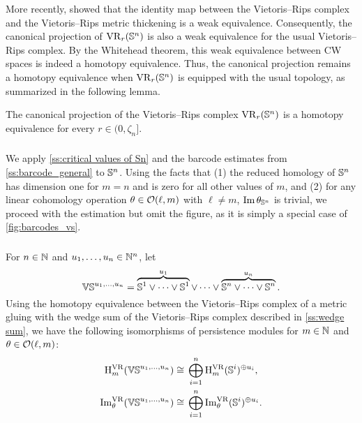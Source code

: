 More recently, \cite{gillespie2024vietoris} showed that the identity map between the Vietoris--Rips complex and the Vietoris--Rips metric thickening is a weak equivalence.
Consequently, the canonical projection of \(\mathrm{VR}_r(\mathbb{S}^n)\) is also a weak equivalence for the usual Vietoris--Rips complex. By the Whitehead theorem, this weak equivalence between CW spaces is indeed a homotopy equivalence.
Thus, the canonical projection remains a homotopy equivalence when \(\mathrm{VR}_r(\mathbb{S}^n)\) is equipped with the usual topology, as summarized in the following lemma.

\lemma
The canonical projection of the Vietoris--Rips complex \(\mathrm{VR}_r(\mathbb{S}^n)\) is a homotopy equivalence for every $r \in (0, \zeta_n]$.

\subsubsection{}\label{ss:barcode_Sn}

We apply \cref{ss:critical values of Sn} and the barcode estimates from \cref{ss:barcode_general} to \(\mathbb{S}^n\).
Using the facts that (1) the reduced homology of \(\mathbb{S}^n\) has dimension one for \(m = n\) and is zero for all other values of \(m\), and (2) for any linear cohomology operation \(\theta \in \mathcal{O}(\ell, m)\) with \(\ell \neq m\), \(\operatorname{Im} \theta_{\mathbb{S}^n}\) is trivial, we proceed with the estimation but omit the figure, as it is simply a special case of \cref{fig:barcodes_vs}.

\subsubsection{}\label{ss:barcodes_VS}

For $n \in \mathbb{N}$ and $u_1, \dots, u_n \in \mathbb{N}^n$, let
\[
\mathbb{VS}^{u_1,\dots,u_n} =
\overbrace{\mathbb{S}^1\vee\dots\vee\mathbb{S}^1}^{u_1} \vee\dots\vee \overbrace{\mathbb{S}^n\vee\dots\vee\mathbb{S}^n}^{u_n}.
\]
Using the homotopy equivalence between the Vietoris--Rips complex of a metric gluing with the wedge sum of the Vietoris--Rips complex described in \cref{ss:wedge sum}, we have the following isomorphisms of persistence modules for \(m \in \mathbb{N}\) and \(\theta \in \mathcal{O}(\ell,m)\):
\[
\begin{split}
	\mathrm{H}_m^{\mathrm{VR}}(\mathbb{VS}^{u_1,\dots,u_n}) &\cong \, \bigoplus_{i=1}^n \mathrm{H}_m^{\mathrm{VR}}(\mathbb{S}^i)^{\oplus u_i}, \\
	\operatorname{Im}_\theta^{\mathrm{VR}}(\mathbb{VS}^{u_1,\dots,u_n}) &\cong \, \bigoplus_{i=1}^n \operatorname{Im}_\theta^{\mathrm{VR}}(\mathbb{S}^i)^{\oplus u_i}.
\end{split}
\]

